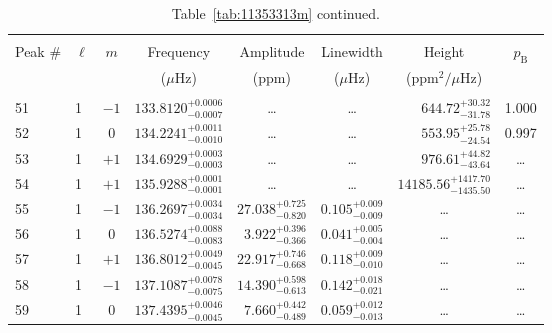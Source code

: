 \begin{table*}[!]
\caption{Table~\ref{tab:11353313m} continued.}
\label{tab:11353313m2}
\centering
\begin{tabular}{llcrrlrc}
\hline\hline
\\[-8pt]          
Peak \# & $\ell$ & $m$ & \multicolumn{1}{c}{Frequency} & \multicolumn{1}{c}{Amplitude} & \multicolumn{1}{c}{Linewidth} & \multicolumn{1}{c}{Height}& $p_\mathrm{B}$\\
 & & & \multicolumn{1}{c}{($\mu$Hz)} & \multicolumn{1}{c}{(ppm)} & \multicolumn{1}{c}{($\mu$Hz)} & \multicolumn{1}{c}{(ppm$^2/\mu$Hz)}\\
\hline \\[-8pt]
51 & 1 & $-1$  & $    133.8120_{-      0.0007}^{+      0.0006}$ & \multicolumn{1}{c}{\dots} & \multicolumn{1}{c}{\dots} & $      644.72_{-       31.78}^{+       30.32}$ & 1.000 \\[1pt]
52 & 1 & 0 & $    134.2241_{-      0.0010}^{+      0.0011}$ & \multicolumn{1}{c}{\dots} & \multicolumn{1}{c}{\dots} & $      553.95_{-       24.54}^{+       25.78}$ & 0.997 \\[1pt]
53 & 1 & $+1$ & $    134.6929_{-      0.0003}^{+      0.0003}$ & \multicolumn{1}{c}{\dots} & \multicolumn{1}{c}{\dots} & $      976.61_{-       43.64}^{+       44.82}$ & \dots \\[1pt]
54 & 1 & $+1$ & $    135.9288_{-      0.0001}^{+      0.0001}$ & \multicolumn{1}{c}{\dots} & \multicolumn{1}{c}{\dots} & $    14185.56_{-     1435.50}^{+     1417.70}$ & \dots \\[1pt]
55 & 1 & $-1$ & $    136.2697_{-      0.0034}^{+      0.0034}$ & $      27.038_{-       0.820}^{+       0.725}$ & $       0.105_{-       0.009}^{+       0.009}$ & \multicolumn{1}{c}{\dots} & \dots \\[1pt]
56 & 1 & 0 & $    136.5274_{-      0.0083}^{+      0.0088}$ & $       3.922_{-       0.366}^{+       0.396}$ & $       0.041_{-       0.004}^{+       0.005}$ & \multicolumn{1}{c}{\dots} & \dots \\[1pt]
57 & 1 & $+1$ & $    136.8012_{-      0.0045}^{+      0.0049}$ & $      22.917_{-       0.668}^{+       0.746}$ & $       0.118_{-       0.010}^{+       0.009}$ & \multicolumn{1}{c}{\dots} & \dots \\[1pt]
58 & 1 & $-1$ & $    137.1087_{-      0.0075}^{+      0.0078}$ & $      14.390_{-       0.613}^{+       0.598}$ & $       0.142_{-       0.021}^{+       0.018}$ & \multicolumn{1}{c}{\dots} & \dots \\[1pt]
59 & 1 & 0 & $    137.4395_{-      0.0045}^{+      0.0046}$ & $       7.660_{-       0.489}^{+       0.442}$ & $       0.059_{-       0.013}^{+       0.012}$ & \multicolumn{1}{c}{\dots} & \dots \\[1pt]

\end{tabular}
\end{table*}
